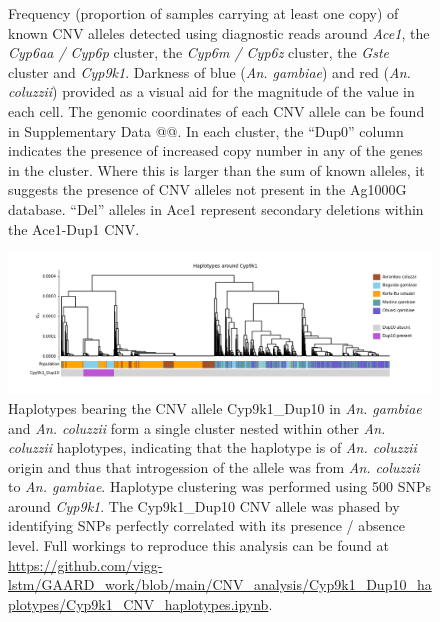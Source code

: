\documentclass[a4paper,12pt]{article}
\begin{document}
\begin{figure}[h]
\begin{center}
		\vskip 0.4cm
	\end{center}
	\caption{\footnotesize Frequency (proportion of samples carrying at least one copy) of known CNV alleles detected using diagnostic reads around \textit{Ace1}, the \textit{Cyp6aa / Cyp6p} cluster, the \textit{Cyp6m / Cyp6z} cluster, the \textit{Gste} cluster and \textit{Cyp9k1}. Darkness of blue (\textit{An. gambiae}) and red (\textit{An. coluzzii}) provided as a visual aid for the magnitude of the value in each cell. The genomic coordinates of each CNV allele can be found in Supplementary Data @@. In each cluster, the ``Dup0'' column indicates the presence of increased copy number in any of the genes in the cluster. Where this is larger than the sum of known alleles, it suggests the presence of CNV alleles not present in the Ag1000G database. ``Del'' alleles in Ace1 represent secondary deletions within the Ace1-Dup1 CNV.}
	\label{FigS2}
\end{figure}

\clearpage

\begin{figure}[h]
	\includegraphics*[width = 17cm]{../../CNV_analysis/Cyp9k1_Dup10_haplotypes/Cyp9k1_haplotype_clustering.png}
	\caption{\footnotesize Haplotypes bearing the CNV allele Cyp9k1\_Dup10 in \textit{An. gambiae} and \textit{An. coluzzii} form a single cluster nested within other \textit{An. coluzzii} haplotypes, indicating that the haplotype is of \textit{ An. coluzzii} origin and thus that introgession of the allele was from \textit{An. coluzzii} to \textit{An. gambiae}. Haplotype clustering was performed using 500 SNPs around \textit{Cyp9k1}. The Cyp9k1\_Dup10 CNV allele was phased by identifying SNPs perfectly correlated with its presence / absence level. Full workings to reproduce this analysis can be found at \url{https://github.com/vigg-lstm/GAARD\_work/blob/main/CNV\_analysis/Cyp9k1\_Dup10\_haplotypes/Cyp9k1\_CNV\_haplotypes.ipynb}.}
	\label{FigS3}
\end{figure}
\end{document}
